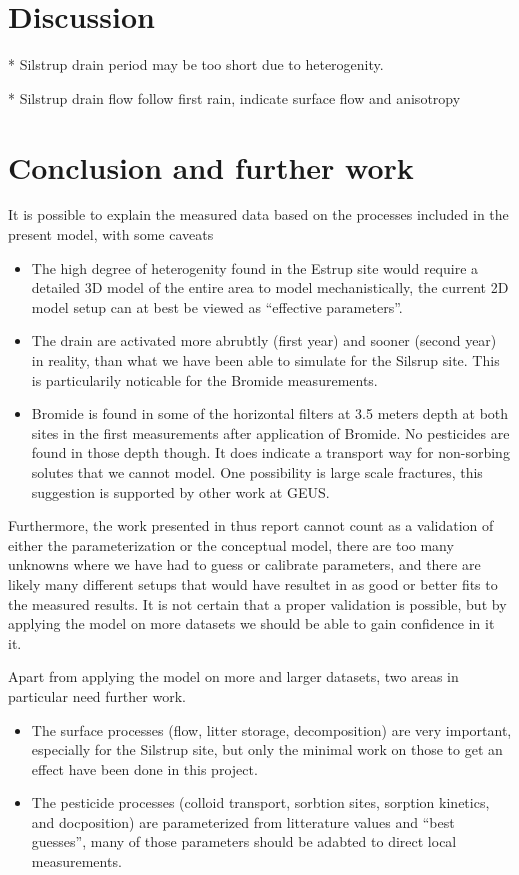 \documentclass[a4paper]{article}
\begin{document}
\begin{text}
\section{Discussion}

* Silstrup drain period may be too short due to heterogenity.

* Silstrup drain flow follow first rain, indicate surface flow and anisotropy

\section{Conclusion and further work}

It is possible to explain the measured data based on the processes
included in the present model, with some caveats
\begin{itemize}
\item The high degree of heterogenity found in the Estrup site would
  require a detailed 3D model of the entire area to model
  mechanistically, the current 2D model setup can at best be viewed as
  ``effective parameters''.
\item The drain are activated more abrubtly (first year) and sooner
  (second year) in reality, than what we have been able to simulate
  for the Silsrup site.  This is particularily noticable for the
  Bromide measurements.  
\item Bromide is found in some of the horizontal filters at 3.5 meters
  depth at both sites in the first measurements after application of
  Bromide.  No pesticides are found in those depth though.  It does
  indicate a transport way for non-sorbing solutes that we cannot
  model.  One possibility is large scale fractures, this suggestion is
  supported by other work at GEUS.
\end{itemize}

Furthermore, the work presented in thus report cannot count as a
validation of either the parameterization or the conceptual model,
there are too many unknowns where we have had to guess or calibrate
parameters, and there are likely many different setups that would have
resultet in as good or better fits to the measured results.  It is not
certain that a proper validation is possible, but by applying the
model on more datasets we should be able to gain confidence in it it.

Apart from applying the model on more and larger datasets, two areas
in particular need further work.
\begin{itemize}
\item The surface processes (flow, litter storage, decomposition) are
  very important, especially for the Silstrup site, but only the
  minimal work on those to get an effect have been done in this project.
\item The pesticide processes (colloid transport, sorbtion sites,
  sorption kinetics, and docposition) are parameterized from
  litterature values and ``best guesses'', many of those parameters
  should be adabted to direct local measurements.
\end{itemize}
\end{text}
  
\end{document}
